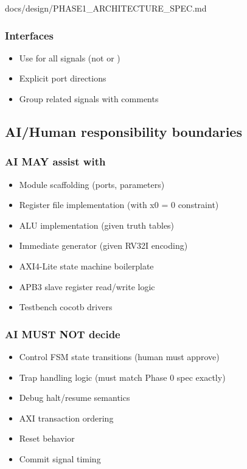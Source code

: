 \begin{relocated}{docs/design/PHASE1_ARCHITECTURE_SPEC.md}
\subsubsection{Interfaces}\label{ds:ch:phase1-architecture:interfaces}

\begin{itemize}
\tightlist
\item
  Use  for all signals (not  or )
\item
  Explicit port directions
\item
  Group related signals with comments
\end{itemize}

\subsection{AI/Human responsibility boundaries}\label{ds:ch:phase1-architecture:aihuman-responsibility-boundaries}

\subsubsection{AI MAY assist with}\label{ds:ch:phase1-architecture:ai-may-assist-with}

\begin{itemize}
\tightlist
\item
  Module scaffolding (ports, parameters)
\item
  Register file implementation (with x0 = 0 constraint)
\item
  ALU implementation (given truth tables)
\item
  Immediate generator (given RV32I encoding)
\item
  AXI4-Lite state machine boilerplate
\item
  APB3 slave register read/\allowbreak{}write logic
\item
  Testbench cocotb drivers
\end{itemize}

\subsubsection{AI MUST NOT decide}\label{ds:ch:phase1-architecture:ai-must-not-decide}

\begin{itemize}
\tightlist
\item
  Control FSM state transitions (human must approve)
\item
  Trap handling logic (must match Phase 0 spec exactly)
\item
  Debug halt/\allowbreak{}resume semantics
\item
  AXI transaction ordering
\item
  Reset behavior
\item
  Commit signal timing
\end{itemize}


\end{relocated}
